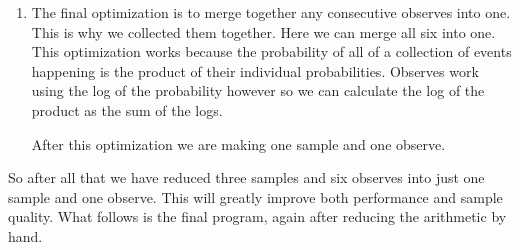 \documentclass[a4paper]{article}
\begin{document}
\begin{enumerate}
\begin{center}
\begin{varwidth}{\linewidth}
\begin{verbatim}
				int main(int argc, char **argv) {
				    double gradient = uniform_rng(0.0, 1.0);

				    observe(normal_lnp(20.0,
				                       gradient * 88.6,
				                       392.798));
				    observe(normal_lnp(16.0,
				                       gradient * 0.009572350164697 + 16.1603674152755,
				                       0.172665339437));
				    observe(normal_lnp(19.8,
				                       gradient * 0.0215414920690030 + 20.9779100181940,
				                       0.171472119913));
				    observe(normal_lnp(18.4,
				                       gradient * 0.00714550738045528 + 18.5274790332219,
				                       0.132812797595));
				    observe(normal_lnp(17.1,
				                       gradient * 0.0032241962331263 + 17.6916967883102,
				                       0.123114249847));
				    observe(normal_lnp(15.5,
				                       gradient * -0.0005048414824 + 16.4109671553285,
				                       0.118203847628));
				    
				    predict("%s,%f\n", "gradient", gradient);
				    return 0;
				}
			\end{verbatim}
		\end{varwidth}
	\end{center}

\item
	The final optimization is to merge together any consecutive observes into one. This is why we collected them together. Here we can merge all six into one. This optimization works because the probability of all of a collection of events happening is the product of their individual probabilities. Observes work using the log of the probability however so we can calculate the log of the product as the sum of the logs.

	After this optimization we are making one sample and one observe.

\end{enumerate}

So after all that we have reduced three samples and six observes into just one sample and one observe. This will greatly improve both performance and sample quality. What follows is the final program, again after reducing the arithmetic by hand.
\end{document}
